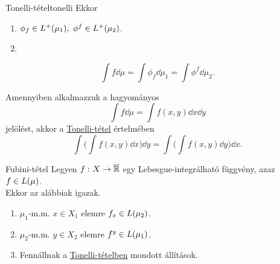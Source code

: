 \documentclass[
]{elteikthesis}[2024/04/26]
\begin{document}
	\begin{theorem}{Tonelli-tétel}{tonelli}
		Ekkor
		\begin{enumerate}[label=\alph*)]
			\item \( \phi_f \in \StepFuncPlus(\mu_1), \ \phi^f \in \StepFuncPlus(\mu_2) \).
			\item
		\end{enumerate}
		\[
			\int f \dd{\mu} = 
			\int \phi_f \dd{\mu_1} =
			\int \phi^f \dd{\mu_2}.
		\]
	\end{theorem}
	
	\vspace{6pt}
	\noindent
	Amennyiben alkalmazzuk a hagyományos
	\[
		\int f \dd{\mu} = 
		\int f(x, y) \dd{x} \dd{y}
	\]
	jelölést, akkor a \hyperref[th:tonelli]{Tonelli-tétel} értelmében
	\[
		\int \biggl( \int f(x, y) \dd{x} \biggr) \dd{y} =
		\int \biggl( \int f(x, y) \dd{y} \biggr) \dd{x}.
	\]
	
	\begin{theorem}{Fubini-tétel}{}
		Legyen \( f \,\colon X \to \overline{\mathbb{R}} \) egy Lebesgue-integrálható függvény, 
		azaz \( f \in \Lebesgue(\mu) \).\\[6pt]
		Ekkor az alábbiak igazak.
		\begin{enumerate}[label*=\alph*)]
			\item \( \mu_1 \)-m.m. \( x \in X_1 \) elemre \( f_x \in \Lebesgue(\mu_2) \).
			\item \( \mu_2 \)-m.m. \( y \in X_2 \) elemre \( f^y \in \Lebesgue(\mu_1) \).
			\item Fennállnak a \hyperref[th:tonelli]{Tonelli-tételben} mondott állítások.
		\end{enumerate}
	\end{theorem}
	
\end{document}
